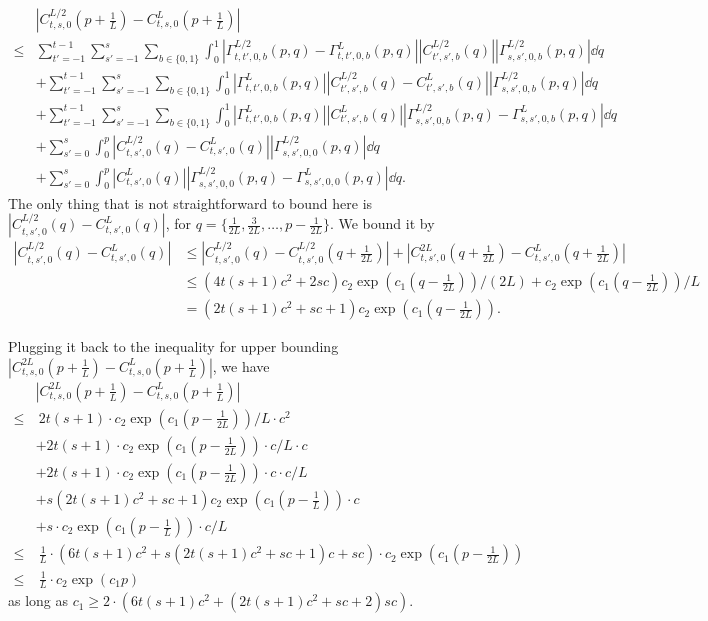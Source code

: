 \documentclass{article}
\theoremstyle{plain}
\theoremstyle{definition}
\begin{document}
\iffalse
\begin{align*}
 & |C^{L/2}_{t,s,0}(p+\frac1L) - C^L_{t,s,0}(p+\frac1L)| \\
    \leq & \sum_{t'=-1}^{t-1}\sum_{s'=-1}^{s}\sum_{b\in\{0,1\}}\int_0^1 |\Gamma^{L/2}_{t,t',0,b}(p,q) - \Gamma^L_{t,t',0,b}(p,q)| |C^{L/2}_{t',s',b}(q)||\Gamma^{L/2}_{s,s',0,b}(p,q)| \dd q \\
    & +\sum_{t'=-1}^{t-1}\sum_{s'=-1}^{s}\sum_{b\in\{0,1\}}\int_0^1 |\Gamma^{L}_{t,t',0,b}(p,q)| |C^{L/2}_{t',s',b}(q) -C^L_{t',s',b}(q)||\Gamma^{L/2}_{s,s',0,b}(p,q)| \dd q \\
    & + \sum_{t'=-1}^{t-1}\sum_{s'=-1}^{s}\sum_{b\in\{0,1\}}\int_0^1 |\Gamma^{L}_{t,t',0,b}(p,q)| |C^{L}_{t',s',b}(q)||\Gamma^{L/2}_{s,s',0,b}(p,q) -\Gamma^L_{s,s',0,b}(p,q)| \dd q \\
    & + \sum_{s'=0}^{s}\int_0^{p} |C^{L/2}_{t,s',0}(q) -C^L_{t,s',0}(q)||\Gamma^{L/2}_{s,s',0,0}(p,q)| \dd q\\
    & + \sum_{s'=0}^{s}\int_0^{p} |C^L_{t,s',0}(q)||\Gamma^{L/2}_{s,s',0,0}(p,q) -\Gamma^L_{s,s',0,0}(p,q)| \dd q.
\end{align*}
The only thing that is not straightforward to bound here is $|C^{L/2}_{t,s',0}(q) -C^L_{t,s',0}(q)|$, for $q=\{\frac1{2L}, \frac3{2L}, \ldots, p-\frac1{2L}\}$. We bound it by 
\begin{align*}
    |C^{L/2}_{t,s',0}(q) -C^L_{t,s',0}(q)| & \leq  |C^{L/2}_{t,s',0}(q) -C^{L/2}_{t,s',0}(q+\frac1{2L})| + |C^{2L}_{t,s',0}(q+\frac1{2L}) -C^L_{t,s',0}(q+\frac 1{2L})|\\
    & \leq (4t(s+1)c^2+2sc)  c_2\exp(c_1 (q-\frac1{2L}))/(2L) + c_2\exp(c_1(q-\frac1{2L}))/L\\
    & = (2t(s+1)c^2+sc + 1)c_2\exp(c_1(q-\frac1{2L})).
\end{align*}

Plugging it back to the inequality for upper bounding $|C^{2L}_{t,s,0}(p+\frac1L) - C^L_{t,s,0}(p+\frac1L)|$, we have
\begin{align*}
 & |C^{2L}_{t,s,0}(p+\frac1L) - C^L_{t,s,0}(p+\frac1L)| \\
    \leq &~ 2t(s+1) \cdot c_2\exp(c_1(p-\frac1{2L})) / L \cdot c^2 \\
    & + 2t(s+1) \cdot c_2\exp(c_1(p-\frac1{2L})) \cdot c/L \cdot c \\
    & +  2t(s+1) \cdot c_2\exp(c_1(p-\frac1{2L})) \cdot c \cdot c/L  \\
    & + s (2t(s+1)c^2+sc + 1)c_2\exp(c_1(p-\frac1L))
    \cdot c \\
    & + s\cdot  c_2\exp(c_1(p-\frac1L))\cdot c/L\\
    \leq &~ \frac{1}{L}\cdot (6t(s+1)c^2+s(2t(s+1)c^2+sc+1)c+sc)\cdot c_2\exp(c_1(p-\frac1{2L}))\\
    \leq &~ \frac{1}{L}\cdot c_2\exp(c_1p)
\end{align*}
as long as $c_1 \geq 2\cdot (6t(s+1)c^2+(2t(s+1)c^2+sc+2)sc)$.
\end{document}
